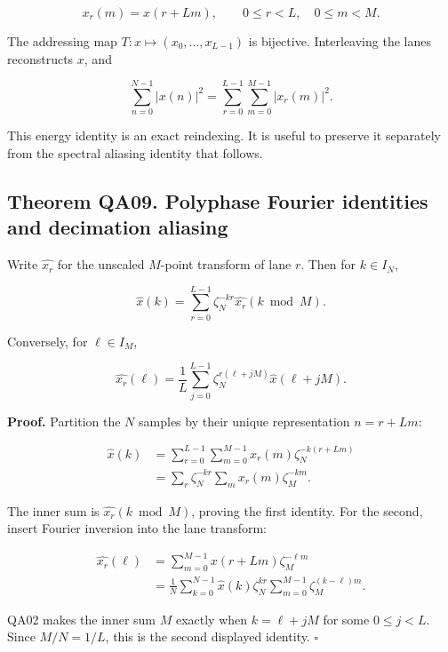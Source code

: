 \[
x_r(m)=x(r+Lm),
\qquad 0\le r<L,\quad 0\le m<M.
\]

The addressing map \(T:x\mapsto(x_0,\ldots,x_{L-1})\) is bijective.
Interleaving the lanes reconstructs \(x\), and

\[
\sum_{n=0}^{N-1}|x(n)|^2
=\sum_{r=0}^{L-1}\sum_{m=0}^{M-1}|x_r(m)|^2.
\]

This energy identity is an exact reindexing. It is useful to preserve it
separately from the spectral aliasing identity that follows.

\hypertarget{theorem-qa09.-polyphase-fourier-identities-and-decimation-aliasing}{%
\subsection*{Theorem QA09. Polyphase Fourier identities and decimation
aliasing}\label{theorem-qa09.-polyphase-fourier-identities-and-decimation-aliasing}}

Write \(\widehat{x_r}\) for the unscaled \(M\)-point transform of lane
\(r\). Then for \(k\in I_N\),

\[
\boxed{\widehat{x}(k)
=\sum_{r=0}^{L-1}\zeta_N^{-kr}\widehat{x_r}(k\bmod M).}
\]

Conversely, for \(\ell\in I_M\),

\[
\boxed{\widehat{x_r}(\ell)
=\frac1L\sum_{j=0}^{L-1}
\zeta_N^{r(\ell+jM)}\widehat{x}(\ell+jM).}
\]

\textbf{Proof.} Partition the \(N\) samples by their unique
representation \(n=r+Lm\):

\[
\begin{aligned}
\widehat{x}(k)
&=\sum_{r=0}^{L-1}\sum_{m=0}^{M-1}
x_r(m)\zeta_N^{-k(r+Lm)}\\
&=\sum_r\zeta_N^{-kr}\sum_mx_r(m)\zeta_M^{-km}.
\end{aligned}
\]

The inner sum is \(\widehat{x_r}(k\bmod M)\), proving the first
identity. For the second, insert Fourier inversion into the lane
transform:

\[
\begin{aligned}
\widehat{x_r}(\ell)
&=\sum_{m=0}^{M-1}x(r+Lm)\zeta_M^{-\ell m}\\
&=\frac1N\sum_{k=0}^{N-1}\widehat{x}(k)\zeta_N^{kr}
\sum_{m=0}^{M-1}\zeta_M^{(k-\ell)m}.
\end{aligned}
\]

QA02 makes the inner sum \(M\) exactly when \(k=\ell+jM\) for some
\(0\le j<L\). Since \(M/N=1/L\), this is the second displayed identity.
\(\square\)

